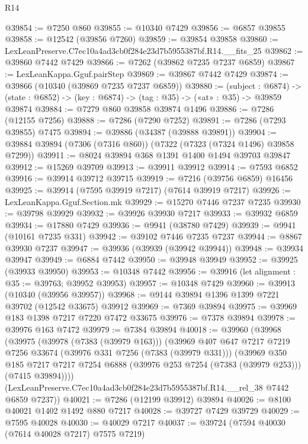 \begin{lexlean}{R14}
\begin{coremodule}
@39854 := @7250 @860
@39855 := @10340 @7429
@39856 := @6857 @39855
@39858 := @12542 (@39856 @7260)
@39859 := @39854 @39858
@39860 := LexLeanPreserve.C7ec10a4ad3cb0f284e23d7b5955387bf.R14.__fits_25
@39862 := @39860 @7442 @7429
@39866 := @7262 (@39862 @7235 @7237 @6859)
@39867 := LexLeanKappa.Gguf.pairStep
@39869 := @39867 @7442 @7429
@39874 := @39866 (@10340 (@39869 @7235 @7237 @6859))
@39880 := (subject : @6874) ->
  (state : @6852) -> (key : @6874) -> (tag : @35) -> («at» : @35) -> @39859 @39874
@39884 := @7279 @860 @39858 @39874 @1496
@39886 := @7286 (@12155 @7256)
@39888 := @7286 (@7290 @7252)
@39891 := @7286 (@7293 @39855) @7475
@39894 := @39886 (@34387 (@39888 @39891))
@39904 := @39884 @39894 (@7306 (@7316 @860)) (@7322 (@7323 (@7324 @1496) @39858 @7299))
@39911 := @8024 @39894 @368 @1391 @1400 @1494 @39703 @39847
@39912 := @15269 @39709
@39913 := @39911 @39912
@39914 := @7593 @6852
@39916 := @39914 @39712 @39715
@39919 := @7216 (@39756 @6859) @16456
@39925 := @39914 (@7595 @39919 @7217) (@7614 @39919 @7217)
@39926 := LexLeanKappa.Gguf.Section.mk
@39929 := @15270 @7446 @7237 @7235
@39930 := @39798 @39929
@39932 := @39926 @39930 @7217
@39933 := @39932 @6859
@39934 := @17880 @7429
@39936 := @9941 (@38780 @7429)
@39939 := @9941 (@10161 @7235 @331)
@39942 := @39102 @7446 @7235 @7237
@39944 := @8867 @39930 @7237
@39947 := @39936 (@39939 (@39942 @39944))
@39948 := @39934 @39947
@39949 := @6884 @7442
@39950 := @39948 @39949
@39952 := @39925 (@39933 @39950)
@39953 := @10348 @7442
@39956 := @39916 (let alignment : @35 := @39763; @39952 @39953)
@39957 := @10348 @7429
@39960 := @39913 (@10340 (@39956 @39957))
@39968 := @9144 @39894 @1396 @1399 @7221 @39702 (@12542 @33675) @39912
@39969 := @7369 @39894
@39975 := @39969 @183 @1398 @7217 @7220 @7472 @33675
@39976 := @7378 @39894
@39978 := @39976 @163 @7472
@39979 := @7384 @39894
@40018 := @39960
    (@39968
      (@39975
        (@39978 (@7383 (@39979 @163)))
        (@39969
          @407
          @647
          @7217
          @7219
          @7256
          @33674
          (@39976 @331 @7256 (@7383 (@39979 @331)))
          (@39969
            @350
            @185
            @7217
            @7217
            @7254
            @6888
            (@39976 @253 @7254 (@7383 (@39979 @253)))
            (@7415 @39894))))
      (LexLeanPreserve.C7ec10a4ad3cb0f284e23d7b5955387bf.R14.__rel_38 @7442 @6859 @7237))
@40021 := @7286 (@12199 @39912) @39894
@40026 := @8100 @40021 @1402 @1492 @880 @7217
@40028 := @39727 @7429 @39729
@40029 := @7595 @40028
@40030 := @40029 @7217
@40037 := @39724 (@7594 @40030 (@7614 @40028 @7217) @7575 @7219)

\end{coremodule}
\end{lexlean}
